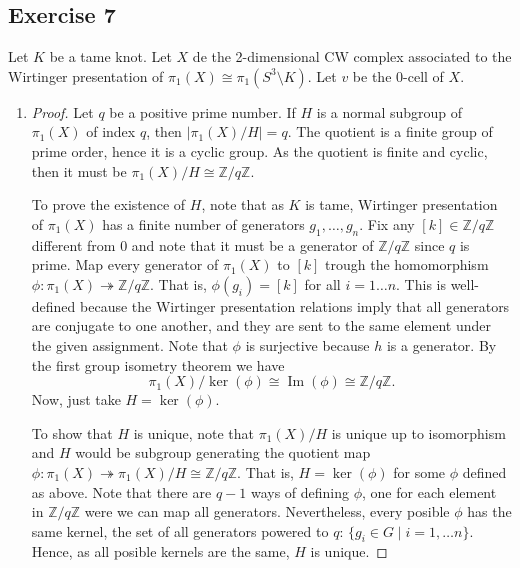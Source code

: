\documentclass[11pt,a4paper]{article}
\newcommand{\im}{\operatorname{Im}}
\newcommand{\Z}{\mathbb Z}
\begin{document}
\subsection*{Exercise 7}
Let $ K $ be a tame knot. Let $X$ de the 2-dimensional CW complex associated to the Wirtinger presentation of $\pi_1(X) \cong \pi_1(S^3 \setminus K)$. Let $v$ be the $0$-cell of $X$.
\begin{enumerate}[label=\alph*)]
  \item \begin{proof}
    Let $ q $ be a positive prime number. If $ H $ is a normal subgroup of $ \pi_1(X) $ of index $ q $, then $ |\pi_1(X)/H| = q $. The quotient is a finite group of prime order, hence it is a cyclic group. As the quotient is finite and cyclic, then it must be $ \pi_1(X)/H \cong \Z / q\Z $.

    To prove the existence of $H$, note that as $ K $ is tame, Wirtinger presentation of $\pi_1(X)$ has a finite number of generators $ g_1, \dots, g_n$. Fix any $[k] \in \Z / q\Z $ different from $ 0 $ and note that it must be a generator of $ \Z / q\Z $ since $ q $ is prime. Map every generator of $\pi_1(X)$ to $ [k] $ trough the homomorphism $ \phi \colon \pi_1(X) \twoheadrightarrow \Z / q\Z $. That is, $ \phi(g_i) = [k] $ for all $ i = 1 \dots n $. This is well-defined because the Wirtinger presentation relations imply that all generators are conjugate to one another, and they are sent to the same element under the given assignment. Note that $ \phi $ is surjective because $ h $ is a generator. By the first group isometry theorem we have
    $$
      \pi_1(X)/\ker(\phi) \cong \im(\phi) \cong \Z / q\Z.
    $$
    Now, just take $ H = \ker(\phi) $.

    To show that $ H $ is unique, note that $\pi_1(X)/H$ is unique up to isomorphism and $ H $ would be subgroup generating the quotient map $ \phi \colon \pi_1(X) \twoheadrightarrow \pi_1(X) / H \cong \Z / q\Z $. That is, $ H = \ker(\phi) $ for some $ \phi $ defined as above. Note that there are $ q - 1 $ ways of defining $ \phi $, one for each element in $ \Z / q\Z $ were we can map all generators. Nevertheless, every posible $ \phi $ has the same kernel, the set of all generators powered to $ q $: $\{ g_i \in G \mid i = 1, \dots n\} $. Hence, as all posible kernels are the same, $ H $ is unique.
  \end{proof}


\end{enumerate}
\end{document}
